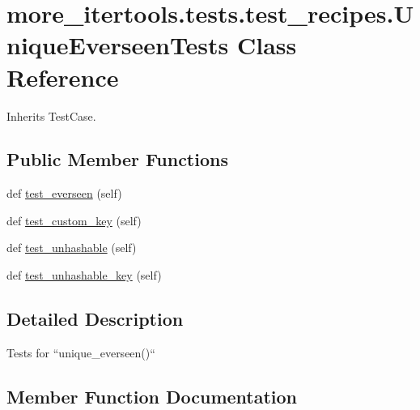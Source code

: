 \hypertarget{classmore__itertools_1_1tests_1_1test__recipes_1_1_unique_everseen_tests}{}\section{more\+\_\+itertools.\+tests.\+test\+\_\+recipes.\+Unique\+Everseen\+Tests Class Reference}
\label{classmore__itertools_1_1tests_1_1test__recipes_1_1_unique_everseen_tests}


Inherits Test\+Case.

\subsection*{Public Member Functions}
\begin{DoxyCompactItemize}
\item 
def \hyperlink{classmore__itertools_1_1tests_1_1test__recipes_1_1_unique_everseen_tests_a564ca5dbb4bc4e459e0a784d6eca83e2}{test\+\_\+everseen} (self)
\item 
def \hyperlink{classmore__itertools_1_1tests_1_1test__recipes_1_1_unique_everseen_tests_ab5d7fe9231444982c4391108db094c47}{test\+\_\+custom\+\_\+key} (self)
\item 
def \hyperlink{classmore__itertools_1_1tests_1_1test__recipes_1_1_unique_everseen_tests_a3b015dd895fce5f5535d6000221bad31}{test\+\_\+unhashable} (self)
\item 
def \hyperlink{classmore__itertools_1_1tests_1_1test__recipes_1_1_unique_everseen_tests_aec94081f292b9be38ffb4dea853e3ad2}{test\+\_\+unhashable\+\_\+key} (self)
\end{DoxyCompactItemize}


\subsection{Detailed Description}
\begin{DoxyVerb}Tests for ``unique_everseen()``\end{DoxyVerb}
 

\subsection{Member Function Documentation}
\mbox{\label{classmore__itertools_1_1tests_1_1test__recipes_1_1_unique_everseen_tests_ab5d7fe9231444982c4391108db094c47}} 
